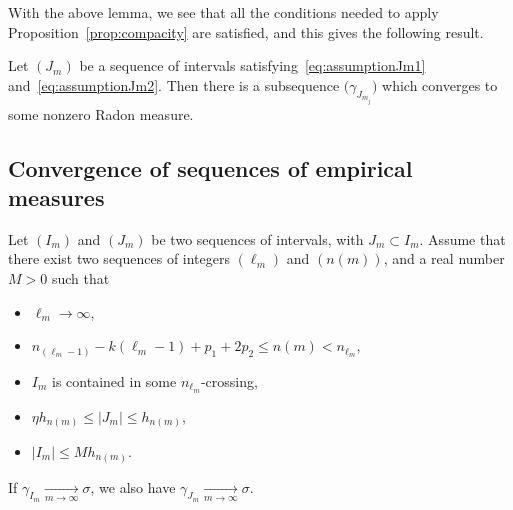 \documentclass[AHL,Unicode,longabstracts]{cedram}
\newcommand{\tend}[3][]{\xrightarrow[#2\to#3]{#1}}
\begin{document}
With the above lemma, we see that all the conditions needed to apply Proposition~\ref{prop:compacity} are satisfied, and this gives the following result.

\begin{lemm}\label{lemma:precompacity}
Let $(J_m)$ be a sequence of intervals satisfying~\eqref{eq:assumptionJm1} and~\eqref{eq:assumptionJm2}. Then there is a subsequence $\bigl(\gamma_{J_{m_j}}\bigr)$ which converges to some nonzero Radon measure.
\end{lemm}

\subsection{Convergence of sequences of empirical measures}

\begin{prop}\label{prop:convergence_empirical_measures_interval}

Let $(I_m)$ and $(J_m)$ be two sequences of intervals, with $J_m\subset I_m$. Assume that there exist two sequences of integers $(\ell_m)$ and $(n(m))$, and a real number $M>0$ such that
\begin{itemize}
\item $\ell_m\to\infty$,
\item $n_{(\ell_m-1)}-k(\ell_m-1) + p_1+ 2p_2 \le n(m)< n_{\ell_m}$,
\item $I_m$ is contained in some $n_{\ell_m}$-crossing,
\item $\eta h_{n(m)}\le |J_m| \le h_{n(m)}$,
\item $|I_m|\le M h_{n(m)}$.
\end{itemize}
If $\gamma_{I_m}\tend{m}{\infty}\sigma$, we also have $\gamma_{J_m}\tend{m}{\infty}\sigma$.
\end{prop}
\end{document}
